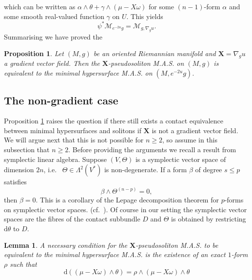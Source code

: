 \documentclass[11pt,letterpaper]{amsart}
\newtheorem{lemma}[theorem]{Lemma}
\newtheorem{proposition}[theorem]{Proposition}
\theoremstyle{definition}
\numberwithin{equation}{section}
\begin{document}
which can be written as $\alpha\wedge\theta+\gamma\wedge(\mu-X\omega)$ for some $(n-1)$-form $\alpha$ and some smooth real-valued function $\gamma$ on $U$. This yields 
$$
\psi^*\mathcal{M}_{e^{-2u}g}=\mathcal{M}_{g,\nabla_{g} u}.
$$
Summarising we have proved the
\begin{proposition}\label{solgrad}
Let $(M,g)$ be an oriented Riemannian manifold and ${\mathbf{X}}=\nabla_g u$ a gradient vector field. Then the ${\mathbf{X}}$-pseudosoliton M.A.S. on $(M,g)$ is equivalent to the minimal hypersurface M.A.S. on $(M,e^{-2u}g)$. 
\end{proposition}

\subsection{The non-gradient case} Proposition \ref{solgrad} raises the question if there still exists a contact equivalence between minimal hypersurfaces and solitons if ${\mathbf{X}}$ is not a gradient vector field. We will argue next that this is not possible for $n \geq 2$, so assume in this subsection that $n\geq 2$. Before providing the arguments we recall a result from symplectic linear algebra. Suppose $(V,\Theta)$ is a symplectic vector space of dimension $2n$, i.e.~ $\Theta \in \Lambda^2(V^*)$ is non-degenerate. If a form $\beta$ of degree $s \leq p$  satisfies
\begin{equation}\label{lepage}
\beta\wedge\Theta^{(n-p)}=0,
\end{equation}
then $\beta=0$. This is a corollary of the Lepage decomposition theorem for $p$-forms on symplectic vector spaces. (cf.~\cite[Corollary 15.15]{MR882548}). Of course in our setting the symplectic vector spaces are the fibres of the contact subbundle $D$ and $\Theta$ is obtained by restricting ${\mathrm{d}}\theta$ to $D$.
\begin{lemma}\label{nec}
A necessary condition for the ${\mathbf{X}}$-pseudosoliton M.A.S. to be equivalent to the minimal hypersurface M.A.S. is the existence of an exact $1$-form $\rho$ such that 
$$
{\mathrm{d}}\left(\left(\mu-X\omega\right)\wedge \theta\right)=\rho\wedge\left(\mu-X\omega\right)\wedge\theta
$$ 
\end{lemma}
\end{document}
